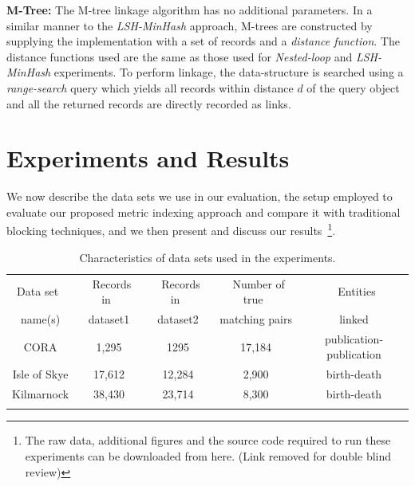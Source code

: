 \documentclass{llncs}
\begin{document}
\textbf{M-Tree:} The M-tree linkage algorithm has no additional parameters. In a similar manner to the \emph{LSH-MinHash} approach, M-trees are constructed by supplying the implementation with a set of records and a \emph{distance function}. The distance functions used are the same as those used for \emph{Nested-loop} and \emph{LSH-MinHash} experiments. To perform linkage, the data-structure is searched using a \emph{range-search} query which yields all records within distance $d$ of the query object and all the returned records are directly recorded as links.


\section{Experiments and Results}
\label{sec-exp}

We now describe the data sets we use in our evaluation, the setup
employed to evaluate our proposed metric indexing approach and
compare it with traditional blocking techniques, and we then present
and discuss our results~\footnote{The raw data, additional figures and the source code required to run these experiments can be downloaded from here. (Link removed for double blind review)}.


\begin{table}[t]
\caption{Characteristics of data sets used in the experiments.}
 \label{table-datasets}
  \centering
  \begin{scriptsize}
  \begin{tabular}{ccccc}
  \hline\noalign{\smallskip}
  Data set~ & ~Records in~& ~Records in~ & ~Number of true~& ~Entities\\
  name(s)  & dataset1  & dataset2  & matching pairs & linked \\
  \noalign{\smallskip} \hline \noalign{\smallskip}
  CORA  & 1,295 & 1295 & 17,184 & publication-publication\\
  Isle of Skye & 17,612 & 12,284& 2,900 & birth-death\\
  Kilmarnock  & 38,430 & 23,714 & 8,300 & birth-death\\
  \noalign{\smallskip} \hline
  \end{tabular}
  \end{scriptsize}
\end{table}
\end{document}
